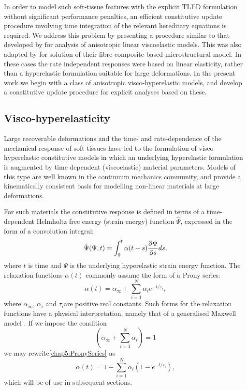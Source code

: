 In order to model such soft-tissue features with the explicit TLED formulation without significant performance penalties, an efficient constitutive update procedure involving time integration of the relevant hereditary equations is required. We address this problem by presenting a procedure similar to that developed by \cite{Poon98} for analysis of anisotropic linear viscoelastic models. This was also adapted by \cite{Taylor07} for solution of their fibre composite-based microstructural model. In these cases the rate independent responses were based on linear elasticity, rather than a hyperelastic formulation suitable for large deformations. In the present work we begin with a class of anisotropic visco-hyperelastic models, and develop a constitutive update procedure for explicit analyses based on these. 
		
	\subsection{Visco-hyperelasticity}
Large recoverable deformations and the time- and rate-dependence of the mechanical response of soft-tissues have led to the formulation of visco-hyperelastic constitutive models in which an underlying hyperelastic formulation is augmented by time dependent (viscoelastic) material parameters. Models of this type are well known in the continuum mechanics community, and provide a kinematically consistent basis for modelling non-linear materials at large deformations.
	
For such materials the constitutive response is defined in terms of a time-dependent Helmholtz free energy (strain energy) function $ \hat{\Psi} $, expressed in the form of a convolution integral:
\begin{equation}
\hat{\Psi} (\Psi ,t) = \int_0^t \alpha (t-s) \dfrac{\partial \Psi}{\partial s} ds,
\end{equation}
where $ t $ is time and $ \Psi $ is the underlying hyperelastic strain energy function. The relaxation functions $ \alpha (t) $ commonly assume the form of a Prony series:
\begin{equation}
\label{chap5:PronySeries}
\alpha (t) = \alpha_{\infty} + \sum_{i=1}^N \alpha_i e^{-t/\tau_i},
\end{equation}
where $ \alpha_{\infty} $, $ \alpha_i $ and $ \tau_i $are positive real constants. Such forms for the relaxation functions have a physical interpretation, namely that of a generalised Maxwell model \citep{Holzapfel96}. If we impose the condition
\begin{equation}
\left( \alpha_{\infty} + \sum_{i=1}^N \alpha_i \right) = 1
\end{equation}
we may rewrite\eqref{chap5:PronySeries} as
\begin{equation}
\label{chap5:PronySeries2}
\alpha (t) = 1 - \sum_{i=1}^N \alpha_i (1-e^{-t/\tau_i}),
\end{equation}
which will be of use in subsequent sections. 

